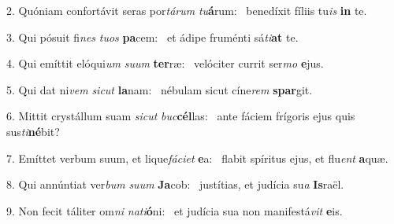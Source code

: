 2. Quóniam confortávit seras por\textit{tá}\textit{rum} \textit{tu}\textbf{á}rum: \ast\  benedíxit fíliis tu\textit{is} \textbf{in} te.\

3. Qui pósuit fi\textit{nes} \textit{tu}\textit{os} \textbf{pa}cem: \ast\  et ádipe fruménti sá\textit{ti}\textbf{at} te.\

4. Qui emíttit elóqui\textit{um} \textit{su}\textit{um} \textbf{ter}ræ: \ast\  velóciter currit ser\textit{mo} \textbf{e}jus.\

5. Qui dat ni\textit{vem} \textit{sic}\textit{ut} \textbf{la}nam: \ast\  nébulam sicut cíne\textit{rem} \textbf{spar}git.\

6. Mittit crystállum suam \textit{sic}\textit{ut} \textit{buc}\textbf{cél}las: \ast\  ante fáciem frígoris ejus quis sus\textit{ti}\textbf{né}bit?\

7. Emíttet verbum suum, et lique\textit{fá}\textit{ci}\textit{et} \textbf{e}a: \ast\  flabit spíritus ejus, et flu\textit{ent} \textbf{a}quæ.\

8. Qui annúntiat ver\textit{bum} \textit{su}\textit{um} \textbf{Ja}cob: \ast\  justítias, et judícia su\textit{a} \textbf{Is}raël.\

9. Non fecit táliter om\textit{ni} \textit{na}\textit{ti}\textbf{ó}ni: \ast\  et judícia sua non manifestá\textit{vit} \textbf{e}is.\

